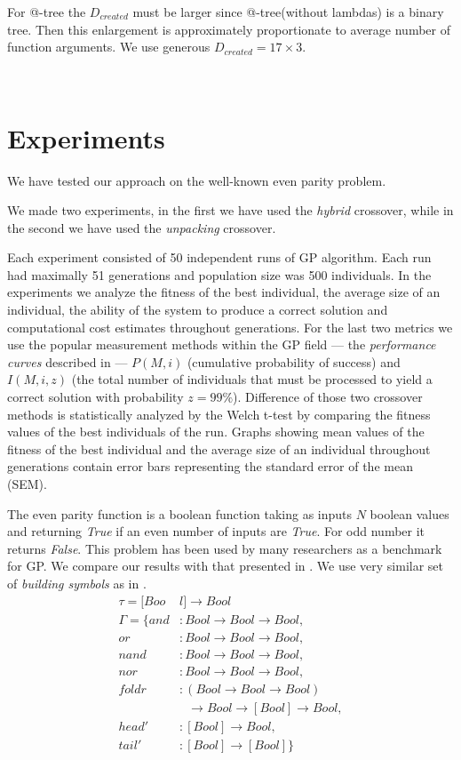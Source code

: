 \documentclass{sig-alternate}
\makeatletter
\newcommand{\atTree}{@-tree\xspace}
\newcommand{\ar}{\rightarrow\xspace}
\makeatother
\begin{document}
For \atTree the $D_{created}$ must be larger since
\atTree (without lambdas) is a binary tree. Then this 
enlargement is approximately proportionate to average number of 
function arguments. We use generous $D_{created} = 17\times3$. 

~\\

\section{Experiments}
\label{experiments}

We have tested our approach on the well-known even parity problem.

We made two experiments, in the first we have used the \textit{hybrid} crossover, while in the second we have used the \textit{unpacking} crossover. 

Each experiment consisted of 50 independent runs 
of GP algorithm. Each run had maximally 51 generations and population size
was 500 individuals.
In the experiments we analyze the fitness of the best individual,
the average size of an individual,
the ability of the system to produce a correct solution 
and computational cost estimates throughout generations. 
For the last two metrics we use the popular measurement  
methods within the GP field --- the \textit{performance curves}
described in \cite{koza92} --- $P(M,i)$ (cumulative probability of success) 
and $I(M,i,z)$ (the total number of individuals that must be processed 
to yield a correct solution with probability $z =99\%$).
Difference of those two crossover methods is statistically analyzed by the Welch t-test by comparing the fitness values of the best individuals of the run. 
Graphs showing mean values of the fitness of the best individual and
the average size of an individual throughout generations contain error bars representing the standard error of the mean (SEM).

The even parity function is a boolean function taking as inputs $N$
boolean values and returning \textit{True} if an even number of inputs 
are \textit{True}. For odd number it returns \textit{False}.
This problem has been used by many researchers
as a benchmark for GP. 
We compare our results with that presented in \cite{yu01, kes}.
We use very similar set of \textit{building symbols} as in \cite{yu01}. 
\begin{align*}
\tau = [Boo&l] \ar Bool\\
\Gamma = \{
  and   &: Bool \ar Bool \ar Bool                              ,\\
  or    &: Bool \ar Bool \ar Bool                              ,\\
  nand  &: Bool \ar Bool \ar Bool                              ,\\
  nor   &: Bool \ar Bool \ar Bool                              ,\\
  foldr &: (Bool \ar Bool \ar Bool) \\
        &~~~\ar Bool \ar [Bool] \ar Bool ,\\
  head' &: [Bool] \ar Bool                                   ,\\
  tail' &: [Bool] \ar [Bool]                              \}
\end{align*}
\end{document}
